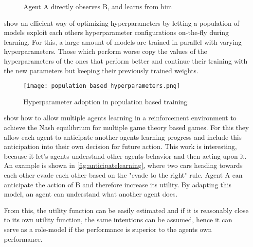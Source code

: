 \documentclass[12pt,a4paper]{article}
\begin{document}
\begin{figure}[H]
    \centering
    \caption{Agent A directly observes B, and learns from him}
    \label{fig:apprenticeschema}
\end{figure}


\citeauthor{jaderberg2017population} show an efficient way of optimizing hyperparameters by letting a population of models exploit each others hyperparameter configurations on-the-fly during learning. For this, a large amount of models are trained in parallel with varying hyperparameters. Those which perform worse copy the values of the hyperparameters of the ones that perform better and continue their training with the new parameters but keeping their previously trained weights.

\begin{figure}[!h]
    \centering
    \texttt{[image: population\_based\_hyperparameters.png]}
    \caption{Hyperparameter adoption in population based training \cite{jaderberg2017population}}
    \label{fig:populationtraining}
\end{figure}

\citeauthor{foerster2017learning} show how to allow multiple agents learning in a reinforcement environment to achieve the Nash equilibrium for multiple game theory based games. For this they allow each agent to anticipate another agents learning progress and include this anticipation into their own decision for future action. This work is interesting, because it let's agents understand other agents behavior and then acting upon it. An example is shown in \autoref{fig:anticipatelearning}, where  two cars heading towards each other evade each other based on the "evade to the right" rule. Agent A can anticipate the action of B and therefore increase its utility. By adapting this model, an agent can understand what another agent does.

From this, the utility function can be easily estimated and if it is reasonably close to its own utility function, the same intentions can be assumed, hence it can serve as a role-model if the performance is superior to the agents own performance.
\end{document}
